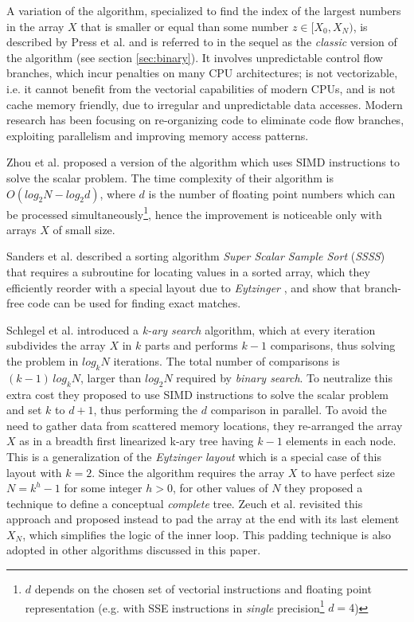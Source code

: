 \documentclass[preprint,1p,times]{elsarticle}
\begin{document}
A variation of the algorithm, specialized to find the index of the largest numbers in the array $X$ that is smaller or equal than some number $z\in[X_0,X_N)$, is described by Press et al. \cite{NRC++} and is referred to in the sequel as the \textit{classic} version of the algorithm (see section \ref{sec:binary}). It involves unpredictable control flow branches, which incur penalties on many CPU architectures; is not vectorizable, i.e. it cannot benefit from the vectorial capabilities of modern CPUs, and is not cache memory friendly, due to irregular and unpredictable data accesses. Modern research has been focusing on re-organizing code to eliminate code flow branches, exploiting parallelism and improving memory access patterns.

Zhou et al. \cite{Zhou2002} proposed a version of the algorithm which uses SIMD instructions to solve the scalar problem. The time complexity of their algorithm is $O(log_2N-log_2d)$, where $d$ is the number of floating point numbers which can be processed simultaneously\footnote{$d$ depends on the chosen set of vectorial instructions and floating point representation (e.g. with SSE instructions in \textit{single} precision\footnote{for a description of \textit{single} and \textit{double} precision floating point representation see \cite{IEEE754}} $d=4$)}, hence the improvement is noticeable only with arrays $X$ of small size.

Sanders et al. \cite{Sanders2004} described a sorting algorithm \textit{Super Scalar Sample Sort}
(\textit{SSSS}) that requires a subroutine for locating values in a sorted array, which they efficiently reorder with a special layout due to \textit{Eytzinger} \cite{Eytzinger1590}, and show that branch-free code can be used for finding exact matches.

Schlegel et al. \cite{kary2009} introduced a \textit{k-ary search} algorithm, which at every iteration subdivides the array $X$ in $k$ parts and performs $k-1$ comparisons, thus solving the problem in $log_kN$ iterations. The total number of comparisons is $(k-1)\,log_kN$, larger than $log_2N$ required by \textit{binary search}. To neutralize this extra cost they proposed to use SIMD instructions to solve the scalar problem and set $k$ to $d+1$, thus performing the $d$ comparison in parallel. To avoid the need to gather data from scattered memory locations, they re-arranged the array $X$ as in a breadth first linearized k-ary tree having $k-1$ elements in each node. This is a generalization of the \textit{Eytzinger layout} which is a special case of this layout with $k=2$. Since the algorithm requires the array $X$ to have perfect size $N=k^h-1$ for some integer $h>0$, for other values of $N$ they proposed a technique to define a conceptual \textit{complete} tree. Zeuch et al. \cite{kary2014} revisited this approach and proposed instead to pad the array at the end with its last element $X_N$, which simplifies the logic of the inner loop. This padding technique is also adopted in other algorithms discussed in this paper.
\end{document}
